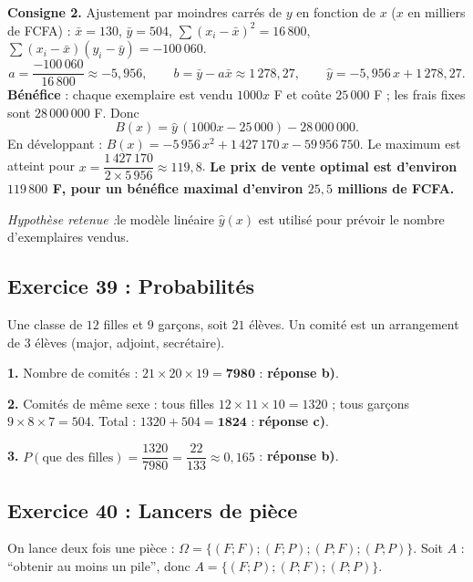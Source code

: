 \documentclass[11pt,a4paper]{article}
\newenvironment{hyp}{\par\medskip\noindent\textit{Hypoth\`ese retenue :}\quad}{\par\medskip}
\begin{document}
\medskip\noindent\textbf{Consigne 2.} Ajustement par moindres carr\'es de $y$ en fonction de $x$ ($x$ en milliers de FCFA) :
$\bar x=130$, $\bar y=504$, $\sum(x_i-\bar x)^2=16\,800$, $\sum(x_i-\bar x)(y_i-\bar y)=-100\,060$.
\[
a=\frac{-100\,060}{16\,800}\approx-5{,}956,\qquad b=\bar y-a\bar x\approx1\,278{,}27,\qquad \hat y=-5{,}956\,x+1\,278{,}27.
\]
\textbf{B\'en\'efice} : chaque exemplaire est vendu $1000x$ F et co\^ute $25\,000$ F ; les frais fixes sont $28\,000\,000$ F. Donc
\[
B(x)=\hat y\,(1000x-25\,000)-28\,000\,000.
\]
En d\'eveloppant : $B(x)=-5\,956\,x^2+1\,427\,170\,x-59\,956\,750$.
Le maximum est atteint pour $x=\dfrac{1\,427\,170}{2\times5\,956}\approx119{,}8$.
\textbf{Le prix de vente optimal est d'environ $119\,800$ F, pour un b\'en\'efice maximal d'environ $25{,}5$ millions de FCFA.}
\begin{hyp}le mod\`ele lin\'eaire $\hat y(x)$ est utilis\'e pour pr\'evoir le nombre d'exemplaires vendus.\end{hyp}

\subsection{Exercice 39 : Probabilit\'es}

Une classe de $12$ filles et $9$ gar\c cons, soit $21$ \'el\`eves. Un comit\'e est un arrangement de $3$ \'el\`eves
(major, adjoint, secr\'etaire).

\textbf{1.} Nombre de comit\'es : $21\times20\times19=\mathbf{7980}$ : \textbf{r\'eponse b)}.

\textbf{2.} Comit\'es de m\^eme sexe : tous filles $12\times11\times10=1320$ ; tous gar\c cons $9\times8\times7=504$.
Total : $1320+504=\mathbf{1824}$ : \textbf{r\'eponse c)}.

\textbf{3.} $P(\text{que des filles})=\dfrac{1320}{7980}=\dfrac{22}{133}\approx0{,}165$ : \textbf{r\'eponse b)}.

\subsection{Exercice 40 : Lancers de pi\`ece}

On lance deux fois une pi\`ece : $\Omega=\{(F;F);(F;P);(P;F);(P;P)\}$. Soit $A$ : ``obtenir au moins un pile'',
donc $A=\{(F;P);(P;F);(P;P)\}$.
\end{document}
